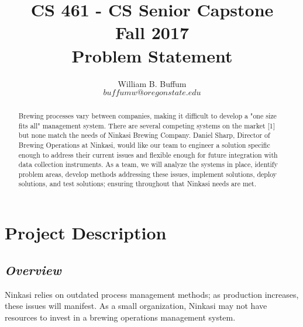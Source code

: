 \documentclass[draftclsnofoot,onecolumn,letterpaper,10pt]{IEEEtran}
\title{CS 461 - CS Senior Capstone
	\\Fall 2017
	\\Problem Statement
}
\author{William B. Buffum \\ \small{\(buffumw@oregonstate.edu\)}}
\begin{document}
\begin{titlingpage}
    \maketitle
    \begin{abstract}
Brewing processes vary between companies, making it difficult to develop a "one size fits all" management system. There are several competing systems on the market [1] but none match the needs of Ninkasi Brewing Company. Daniel Sharp, Director of Brewing Operations at Ninkasi, would like our team to engineer a solution specific enough to address their current issues and flexible enough for future integration with data collection instruments. As a team, we will analyze the systems in place, identify problem areas, develop methods addressing these issues, implement solutions, deploy solutions, and test solutions; ensuring throughout that Ninkasi needs are met.
    \end{abstract}
\end{titlingpage}

\section{\textbf{Project Description}}

\subsection{\textit{Overview}}
Ninkasi relies on outdated process management methods; as production increases, these issues will manifest. As a small organization, Ninkasi may not have resources to invest in a brewing operations management system.
\end{document}
